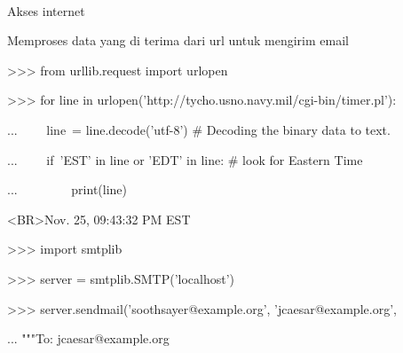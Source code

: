 \documentclass[a4paper,12pt]{report}
\begin{document}
\noindent 
{\fontsize{14pt}{14pt} \\} \par
\vspace{14pt}
\noindent 
{\fontsize{14pt}{14pt}\selectfont Akses internet \\} \par
\noindent 
{\fontsize{14pt}{14pt}\selectfont Memproses data yang di terima dari url untuk mengirim email \\} \par
\vspace{14pt}
\noindent 
{\fontsize{14pt}{14pt}\selectfont >>> from urllib.request import urlopen \\} \par
\vspace{14pt}
\noindent 
{\fontsize{14pt}{14pt}\selectfont >>> for line in urlopen('http://tycho.usno.navy.mil/cgi-bin/timer.pl'): \\} \par
\noindent 
{\fontsize{14pt}{14pt}\selectfont ...~~~~ line~= line.decode('utf-8')   $  \#  $ Decoding the binary data to text. \\} \par
\noindent 
{\fontsize{14pt}{14pt}\selectfont ...~~~~ if~'EST' in line or 'EDT' in line:   $  \#  $ look for Eastern Time \\} \par
\noindent 
{\fontsize{14pt}{14pt}\selectfont ...~~~~~~~~ print(line) \\} \par
\vspace{14pt}
\noindent 
{\fontsize{14pt}{14pt}\selectfont <BR>Nov. 25, 09:43:32 PM EST \\} \par
\vspace{14pt}
\noindent 
{\fontsize{14pt}{14pt}\selectfont >>> import smtplib \\} \par
\vspace{14pt}
\noindent 
{\fontsize{14pt}{14pt}\selectfont >>> server = smtplib.SMTP('localhost') \\} \par
\vspace{14pt}
\noindent 
{\fontsize{14pt}{14pt}\selectfont >>> server.sendmail('soothsayer@example.org', 'jcaesar@example.org', \\} \par
\noindent 
{\fontsize{14pt}{14pt}\selectfont ... """To: jcaesar@example.org \\} \par
\end{document}
